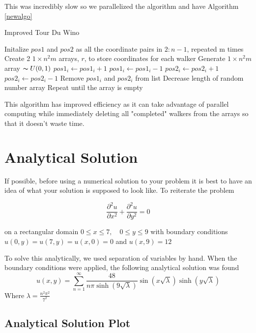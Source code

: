 \documentclass{amsart}
\begin{document}
This was incredibly slow so we parallelized the algorithm and have Algorithm \ref{newalgo}
\begin{algorithm}
	\caption{Improved Tour Du Wino}
	\label{newalgo}
	\begin{algorithmic}[1]
		\State Initalize $pos1$ and $pos2$ as all the coordinate pairs in $2:n-1$, repeated m  times
		\State Create 2 $1 \times n^2m$ arrays, $r$, to store coordinates for each walker
		\State Generate $1 \times n^2m$ array $\thicksim U(0,1)$
			\State $pos1_i \gets pos1_i + 1$
			\State $pos1_i \gets pos1_i - 1$
			\State $pos2_i \gets pos2_i + 1$
		\Else
			\State $pos2_i \gets pos2_i - 1$
		\EndIf
			\State Remove $pos1_i$ and $pos2_i$ from list
			\State Decrease length of random number array
		\EndIf
		\State Repeat until the array is empty
	\end{algorithmic}
\end{algorithm}

This algorithm has improved efficiency as it can take advantage of parallel computing while immediately deleting all "completed" walkers from the arrays so that it doesn't waste time.
\section{Analytical Solution}

If possible, before using a numerical solution to your problem it is best to have an idea of what your solution is supposed to look like. To reiterate the problem

	$$\frac{\partial^2 u}{\partial x^2} + \frac{\partial^2 u}{\partial y^2} = 0$$

on a rectangular domain $0 \leq x \leq 7, \quad 0 \leq y \leq 9$ with boundary conditions $u(0,y) = u(7,y) = u(x,0) = 0$ and $u(x,9) = 12$ 

To solve this analytically, we used separation of variables by hand. When the boundary conditions were applied, the following analytical solution was found
\begin{equation}
    u(x,y)= \sum _{n=1}^{\infty} \frac{48}{n \pi \sinh(9 \sqrt{\lambda})} \sin(x \sqrt{\lambda}) \sinh(y \sqrt{\lambda})
\end{equation}
Where $\lambda=\frac{n^2 \pi ^2}{7^2}$

\subsection{Analytical Solution Plot} 
\end{document}
